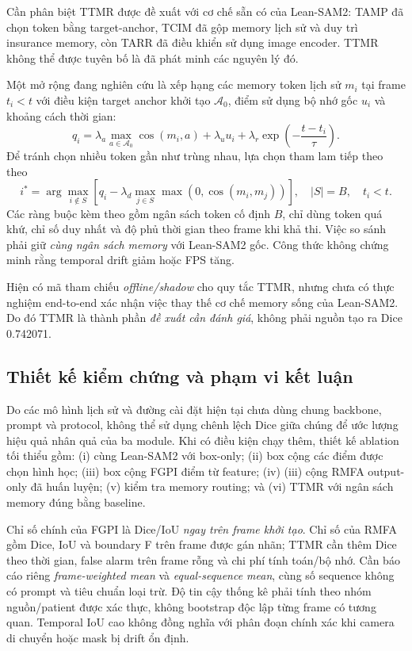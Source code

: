 Cần phân biệt TTMR được đề xuất với cơ chế sẵn có của Lean-SAM2:
TAMP đã chọn token bằng target-anchor, TCIM đã gộp memory lịch sử
và duy trì insurance memory, còn TARR đã điều khiển sử dụng
image encoder. TTMR không thể được tuyên bố là đã phát minh
các nguyên lý đó.

Một mở rộng đang nghiên cứu là xếp hạng các memory token lịch sử
$m_i$ tại frame $t_i<t$ với điều kiện target anchor khởi tạo
$\mathcal{A}_0$, điểm sử dụng bộ nhớ gốc $u_i$ và khoảng cách thời gian:
\begin{equation}
q_i =
\lambda_a\max_{a\in\mathcal{A}_0}\cos(m_i,a)
+\lambda_u u_i
+\lambda_r \exp\left(-\frac{t-t_i}{\tau}\right).
\label{eq:adeseg-ttmr-priority}
\end{equation}
Để tránh chọn nhiều token gần như trùng nhau, lựa chọn tham lam
tiếp theo theo
\begin{equation}
i^*=\arg\max_{i\notin S}
\left[q_i-\lambda_d\max_{j\in S}
\max(0,\cos(m_i,m_j))\right],
\quad |S|=B,
\quad t_i<t.
\label{eq:adeseg-ttmr-diversity}
\end{equation}
Các ràng buộc kèm theo gồm ngân sách token cố định $B$,
chỉ dùng token quá khứ, chỉ số duy nhất và độ phủ thời gian
theo frame khi khả thi. Việc so sánh phải giữ \emph{cùng ngân
sách memory} với Lean-SAM2 gốc. Công thức không chứng minh
rằng temporal drift giảm hoặc FPS tăng.

Hiện có mã tham chiếu \textit{offline/shadow} cho quy tắc TTMR,
nhưng chưa có thực nghiệm end-to-end xác nhận việc thay thế
cơ chế memory sống của Lean-SAM2. Do đó TTMR là thành phần
\emph{đề xuất cần đánh giá}, không phải nguồn tạo ra Dice 0.742071.

\subsection{Thiết kế kiểm chứng và phạm vi kết luận}
\label{subsec:adeseg-validity}

Do các mô hình lịch sử và đường cài đặt hiện tại chưa dùng chung
backbone, prompt và protocol, không thể sử dụng chênh lệch Dice
giữa chúng để ước lượng hiệu quả nhân quả của ba module. Khi có
điều kiện chạy thêm, thiết kế ablation tối thiểu gồm:
(i) cùng Lean-SAM2 với box-only;
(ii) box cộng các điểm được chọn hình học;
(iii) box cộng FGPI điểm từ feature;
(iv) (iii) cộng RMFA output-only đã huấn luyện;
(v) kiểm tra memory routing; và
(vi) TTMR với ngân sách memory đúng bằng baseline.

Chỉ số chính của FGPI là Dice/IoU \emph{ngay trên frame khởi tạo}.
Chỉ số của RMFA gồm Dice, IoU và boundary F trên frame được gán nhãn;
TTMR cần thêm Dice theo thời gian, false alarm trên frame rỗng và
chi phí tính toán/bộ nhớ. Cần báo cáo riêng
\emph{frame-weighted mean} và \emph{equal-sequence mean},
cùng số sequence không có prompt và tiêu chuẩn loại trừ.
Độ tin cậy thống kê phải tính theo nhóm nguồn/patient
được xác thực, không bootstrap độc lập từng frame có tương quan.
Temporal IoU cao không đồng nghĩa với phân đoạn chính xác
khi camera di chuyển hoặc mask bị drift ổn định.

